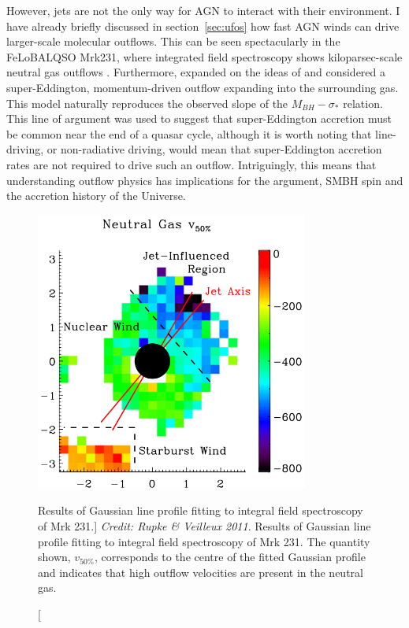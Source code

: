 However, jets are not the only way for AGN to interact with 
their environment. I have already briefly discussed in section~\ref{sec:ufos}
how fast AGN winds can drive larger-scale molecular outflows.
This can be seen spectacularly in the FeLoBALQSO Mrk231, 
where integrated field spectroscopy shows kiloparsec-scale
neutral gas outflows \citep[see Fig.~\ref{fig:rupke};][]{rupke2011}.
Furthermore, \cite{king2003} expanded on the ideas of \cite{silkrees1998} and
considered a super-Eddington, momentum-driven outflow expanding into the surrounding gas. 
This model naturally reproduces the observed slope of the $M_{BH}-\sigma_*$
relation. This line of argument was used to suggest that super-Eddington accretion must be
common near the end of a quasar cycle, although it is worth noting that line-driving,
or non-radiative driving, would mean that super-Eddington accretion rates are 
not required to drive such an outflow. Intriguingly, this means that 
understanding outflow physics has implications for the \cite{soltan1982} argument,
SMBH spin and the accretion history of the Universe.

\begin{figure}
\centering
\includegraphics[width=0.8\textwidth]{figures/02-outflows/rupke2.png}
\caption
[Results of Gaussian line profile fitting to 
integral field spectroscopy of Mrk 231.]
{
{\sl Credit: Rupke \& Veilleux 2011}. 
Results of Gaussian line profile fitting to 
integral field spectroscopy of Mrk 231. The quantity
shown, $v_{50\%}$, corresponds to the centre of the fitted Gaussian
profile and indicates that high outflow velocities 
are present in the neutral gas.
} 
\label{fig:rupke}
\end{figure}


